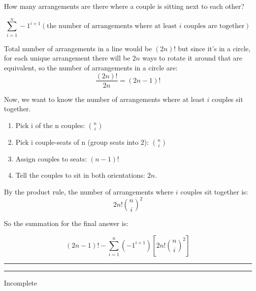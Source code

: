 \documentclass[11pt,letterpaper]{article}
\newcommand{\question}[2] {\vspace{.25in} \hrule\vspace{0.5em}
\noindent{\bf #1: #2} \vspace{0.5em}
\hrule \vspace{.10in}}
\begin{document}
How many arrangements are there where a couple is sitting next to each other?

$$\sum_{i=1}^{n} -1^{i+1} (\text{the number of arrangements where at least } i \text{ couples are together}) $$

Total number of arrangements in a line would be $(2n)!$ but since it's in a circle, for each unique arrangement
there will be $2n$ ways to rotate it around that are equivalent, so the number of arrangements in a circle are:
$$\frac{(2n)!}{2n} = (2n-1)!$$

Now, we want to know the number of arrangements where at least $i$ couples sit together.
\begin{enumerate}
\item Pick i of the n couples: ${n \choose i}$
\item Pick i couple-seats of n (group seats into 2): ${n \choose i}$
\item Assign couples to seats: $ (n-1)! $
\item Tell the couples to sit in both orientations: $2n$.
\end{enumerate}
By the product rule, the number of arrangements where $i$ couples sit together is:
$$ 2n!{n \choose i}^2 $$

So the summation for the final answer is:

$$(2n-1)! - \sum_{i=1}^{n} (-1^{i+1}) [2n!{n \choose i}^2]$$

\question{8}{8}

Incomplete
\end{document}
